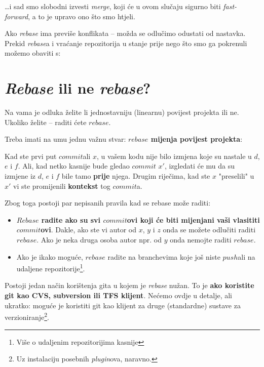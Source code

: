 

\dots{}i sad smo slobodni izvesti \emph{merge}, koji će u ovom slučaju sigurno biti \emph{fast-forward}, a to je upravo ono što smo htjeli.

Ako \emph{rebase} ima previše konflikata -- možda se odlučimo odustati od nastavka.
Prekid \emph{rebase}a i vraćanje repozitorija u stanje prije nego što smo ga pokrenuli možemo obaviti s:


\section*{\emph{Rebase} ili ne \emph{rebase}?}

Na vama je odluka želite li jednostavniju (linearnu) povijest projekta ili ne.
Ukoliko želite -- raditi ćete $rebase$.

Treba imati na umu jednu važnu stvar: \textbf{$rebase$ mijenja povijest projekta}:



Kad ste prvi put $commit$ali $x$, u vašem kodu nije bilo izmjena koje su nastale u $d$, $e$ i $f$. 
Ali, kad netko kasnije bude gledao $commit$ $x'$, izgledati će mu da su izmjene iz $d$, $e$ i $f$ bile tamo \textbf{prije} njega.
Drugim riječima, kad ste $x$ "preselili" u $x'$ vi ste promijenili \textbf{kontekst} tog $commit$a.

Zbog toga postoji par nepisanih pravila kad se rebase može raditi:
\begin{itemize}
    \item \textbf{$Rebase$ radite ako su svi $commit$ovi koji će biti mijenjani vaši vlasititi $commit$ovi}. Dakle, ako ste vi autor od $x$, $y$ i $z$ onda se možete odlučiti raditi $rebase$. Ako je neka druga osoba autor npr. od $y$ onda nemojte raditi $rebase$.
    \item Ako je ikako moguće, $rebase$ radite na branchevima koje još niste $push$ali na udaljene repozitorije\footnote{Više o udaljenim repozitorijima kasnije}.
\end{itemize}


Postoji jedan način korištenja gita u kojem je \emph{rebase} nužan.
To je \textbf{ako koristite git kao CVS, subversion ili TFS klijent}.
Nećemo ovdje u detalje, ali ukratko: moguće je koristiti git kao klijent za druge (standardne) sustave za verzioniranje\footnote{Uz instalaciju posebnih \emph{plugin}ova, naravno.}.

